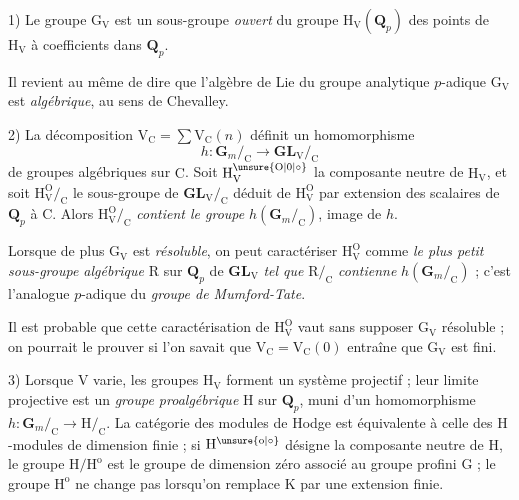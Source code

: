 1) Le groupe $\mathrm{G}_{\mathrm{V}}$ est un sous-groupe \textit{ouvert} du groupe $\mathrm{H}_{\mathrm{V}}(\mathbf{Q}_p)$ des points de $\mathrm{H}_{\mathrm{V}}$ à coefficients dans $\mathbf{Q}_p$.

Il revient au même de dire que l’algèbre de Lie du groupe analytique $p$-adique $\mathrm{G}_{\mathrm{V}}$ est \textit{algébrique}, au sens de Chevalley.

2) La décomposition $\mathrm{V}_{\mathrm{C}}=\sum\mathrm{V}_{\mathrm{C}}(n)$ définit un homomorphisme
\[
h:\mathbf{G}_m/_{\mathrm{C}}\longrightarrow\mathbf{GL}_{\mathrm{V}}/_{\mathrm{C}}
\]
de groupes algébriques sur $\mathrm{C}$. Soit $\mathrm{H}_{\mathrm{V}}^{\unsure{\mathrm{O}|0|\circ}}$ la composante neutre de $\mathrm{H}_{\mathrm{V}}$, et soit $\mathrm{H}_{\mathrm{V}}^{\mathrm{O}}/_{\mathrm{C}}$ le sous-groupe de $\mathbf{GL}_{\mathrm{V}}/_{\mathrm{C}}$ déduit de $\mathrm{H}_{\mathrm{V}}^{\mathrm{O}}$ par extension des scalaires de $\mathbf{Q}_p$ à $\mathrm{C}$. Alors $\mathrm{H}_{\mathrm{V}}^{\mathrm{O}}/_{\mathrm{C}}$ \textit{contient le groupe} $h(\mathbf{G}_m/_{\mathrm{C}})$, image de $h$.

Lorsque de plus $\mathrm{G}_{\mathrm{V}}$ est \textit{résoluble}, on peut caractériser $\mathrm{H}_{\mathrm{V}}^{\mathrm{O}}$ comme \textit{le plus petit sous-groupe algébrique} $\mathrm{R}$ sur $\mathbf{Q}_p$ de $\mathbf{GL}_{\mathrm{V}}$ \textit{tel que} $\mathrm{R}/_{\mathrm{C}}$ \textit{contienne} $h(\mathbf{G}_m/_{\mathrm{C}})$ ; c’est l’analogue $p$-adique du \textit{groupe de Mumford-Tate}.

Il est probable que cette caractérisation de $\mathrm{H}_{\mathrm{V}}^{\mathrm{O}}$ vaut sans supposer $\mathrm{G}_{\mathrm{V}}$ résoluble ; on pourrait le prouver si l’on savait que $\mathrm{V}_{\mathrm{C}}=\mathrm{V}_{\mathrm{C}}(0)$ entraîne que $\mathrm{G}_{\mathrm{V}}$ est fini.
\reversemarginpar
\margin{\handwritten{\shortstack[l]{ceci a été\\démontré par\\S. Sen (Annals)}\,$\left[\vphantom{\begin{matrix}1\\1\\1\end{matrix}}\right.$}}
\normalmarginpar

3) Lorsque $\mathrm{V}$ varie, les groupes $\mathrm{H}_{\mathrm{V}}$ forment un système projectif ; leur limite projective est un \textit{groupe proalgébrique} $\mathrm{H}$ sur $\mathbf{Q}_p$, muni d’un homomorphisme $h:\mathbf{G}_m/_{\mathrm{C}}\longrightarrow\mathrm{H}/_{\mathrm{C}}$. La catégorie des modules de Hodge est équivalente à celle des $\mathrm{H}$-modules de dimension finie ; si $\mathrm{H}^{\unsure{\mathrm{o}|\circ}}$ désigne la composante neutre de $\mathrm{H}$, le groupe $\mathrm{H}/\mathrm{H}^{\mathrm{o}}$ est le groupe de dimension zéro associé au groupe profini $\mathrm{G}$ ; le groupe $\mathrm{H}^{\mathrm{o}}$ ne change pas lorsqu’on remplace $\mathrm{K}$ par une extension finie.

